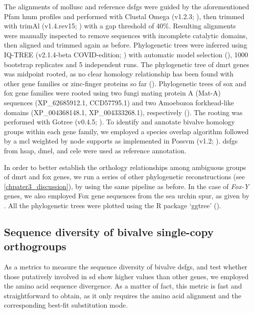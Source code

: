 The alignments of mollusc and reference \glspl{dsfg} were guided by the aforementioned Pfam \gls{hmm} profiles and performed with Clustal Omega (v1.2.3; \textbf{\cite{sievers2011fast}}), then trimmed with trimAl (v1.4.rev15; \textbf{\cite{capella2009trimal}}) with a gap threshold of 40\%. Resulting alignments were manually inspected to remove sequences with incomplete catalytic domains, then aligned and trimmed again as before. Phylogenetic trees were inferred using IQ-TREE (v2.1.4-beta COVID-edition; \textbf{\cite{minh2020iq}}) with automatic model selection (\textbf{\cite{kalyaanamoorthy2017modelfinder}}), 1000 bootstrap replicates and 5 independent runs. The phylogenetic tree of \gls{dmrt} genes was midpoint rooted, as no clear homology relationship has been found with other gene families or zinc-finger proteins so far (\textbf{\cite{wexler2014pan}}). Phylogenetic trees of \gls{sox} and \gls{fox} gene families were rooted using two fungi mating protein A (Mat-A) sequences (XP\_62685912.1, CCD57795.1) and two Amoebozoa forkhead-like domains (XP\_004368148.1, XP\_004333268.1), respectively (\textbf{\cite{heenan2016evolution,nakagawa2013dna}}). The rooting was performed with Gotree (v0.4.5; \textbf{\cite{lemoine2021gotree}}). To identify and annotate bivalve homology groups within each gene family, we employed a species overlap algorithm followed by a \gls{mcl} weighted by node supports as implemented in Possvm (v1.2; \textbf{\cite{grau2021orthology}}). \glspl{dsfg} from \gls{hsap}, \gls{dmel}, and \gls{cele} were used as reference annotation.

In order to better establish the orthology relationships among ambiguous groups of \gls{dmrt} and \gls{fox} genes, we run a series of other phylogenetic reconstructions (see \cref{chpater3_discussion}), by using the same pipeline as before. In the case of \textit{Fox-Y} genes, we also employed Fox gene sequences from the sea urchin \gls{spur}, as given by \textbf{\cite{tu2006sea}}. All the phylogenetic trees were plotted using the R package ‘ggtree’ (\textbf{\cite{yu2017genome}}).

\subsection{Sequence diversity of bivalve single-copy orthogroups}
As a metrics to measure the sequence diversity of bivalve \glspl{dsfg}, and test whether those putatively involved in \gls{sd} show higher values than other genes, we employed the amino acid sequence divergence. As a matter of fact, this metric is fast and straightforward to obtain, as it only requires the amino acid alignment and the corresponding best-fit substitution mode.

